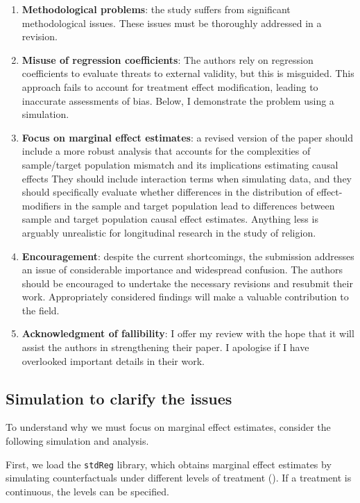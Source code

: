 \documentclass[
  singlecolumn]{article}
\begin{document}
\begin{enumerate}
\def\labelenumi{\arabic{enumi}.}
\item
  \textbf{Methodological problems}: the study suffers from significant
  methodological issues. These issues must be thoroughly addressed in a
  revision.
\item
  \textbf{Misuse of regression coefficients}: The authors rely on
  regression coefficients to evaluate threats to external validity, but
  this is misguided. This approach fails to account for treatment effect
  modification, leading to inaccurate assessments of bias. Below, I
  demonstrate the problem using a simulation.
\item
  \textbf{Focus on marginal effect estimates}: a revised version of the
  paper should include a more robust analysis that accounts for the
  complexities of sample/target population mismatch and its implications
  estimating causal effects They should include interaction terms when
  simulating data, and they should specifically evaluate whether
  differences in the distribution of effect-modifiers in the sample and
  target population lead to differences between sample and target
  population causal effect estimates. Anything less is arguably
  unrealistic for longitudinal research in the study of religion.
\item
  \textbf{Encouragement}: despite the current shortcomings, the
  submission addresses an issue of considerable importance and
  widespread confusion. The authors should be encouraged to undertake
  the necessary revisions and resubmit their work. Appropriately
  considered findings will make a valuable contribution to the field.
\item
  \textbf{Acknowledgment of fallibility}: I offer my review with the
  hope that it will assist the authors in strengthening their paper. I
  apologise if I have overlooked important details in their work.
\end{enumerate}

\subsection{Simulation to clarify the
issues}\label{simulation-to-clarify-the-issues}

To understand why we must focus on marginal effect estimates, consider
the following simulation and analysis.

First, we load the \texttt{stdReg} library, which obtains marginal
effect estimates by simulating counterfactuals under different levels of
treatment (). If a
treatment is continuous, the levels can be specified.
\end{document}
